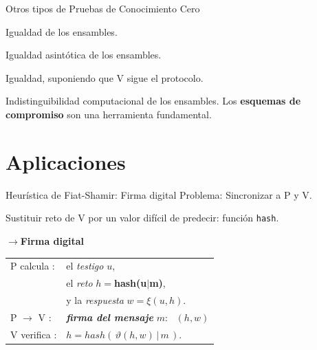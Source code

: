 \documentclass{beamer}
\begin{document}
\begin{frame}{Otros tipos de Pruebas de Conocimiento Cero}
	\begin{description}
		\item[$\uparrow$Perfectas] Igualdad de los ensambles.
		\item[]
		\item[Estadísticas] Igualdad asintótica de los ensambles.
		\item[Verificador Honesto] Igualdad, suponiendo que V sigue el protocolo.
		\item[Computacionales] Indistinguibilidad computacional de los ensambles. Los \textbf{esquemas de compromiso} son una herramienta fundamental.
	\end{description}
\end{frame}



\section{Aplicaciones}

\begin{frame}{Heurística de Fiat-Shamir: Firma digital}
	Problema: Sincronizar a P y V.
	
	Sustituir reto de V por un valor difícil de predecir: función \texttt{hash}.
	
	\textbf{$\rightarrow$Firma digital}
	
	\begin{center}
		\begin{tabular}{ll}
			P calcula :& el \textit{testigo} $u$,\\& el \textit{reto} $h=$\textbf{hash(u$\mid$m)},\\& y la \textit{respuesta} $w = \xi(u, h)$.
			\\
			P $\rightarrow$ V :& \textit{\textbf{firma del mensaje}} $m$: \, $(h,w)$
			\\
			V verifica :& $h=hash(\,\vartheta(h,w)\,|\,m\,)$.
		\end{tabular}
	\end{center}
\end{frame}
\end{document}
